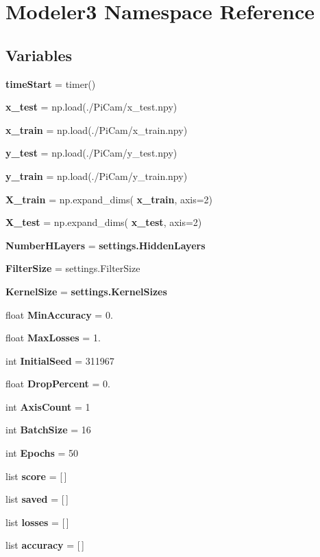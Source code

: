\section{Modeler3 Namespace Reference}
\label{namespace_modeler3}
\subsection*{Variables}
\begin{DoxyCompactItemize}
\item 
\textbf{ time\+Start} = timer()
\item 
\textbf{ x\+\_\+test} = np.\+load(\textquotesingle{}./Pi\+Cam/x\+\_\+test.\+npy\textquotesingle{})
\item 
\textbf{ x\+\_\+train} = np.\+load(\textquotesingle{}./Pi\+Cam/x\+\_\+train.\+npy\textquotesingle{})
\item 
\textbf{ y\+\_\+test} = np.\+load(\textquotesingle{}./Pi\+Cam/y\+\_\+test.\+npy\textquotesingle{})
\item 
\textbf{ y\+\_\+train} = np.\+load(\textquotesingle{}./Pi\+Cam/y\+\_\+train.\+npy\textquotesingle{})
\item 
\textbf{ X\+\_\+train} = np.\+expand\+\_\+dims(\textbf{ x\+\_\+train}, axis=2)
\item 
\textbf{ X\+\_\+test} = np.\+expand\+\_\+dims(\textbf{ x\+\_\+test}, axis=2)
\item 
\textbf{ Number\+H\+Layers} = \textbf{ settings.\+Hidden\+Layers}
\item 
\textbf{ Filter\+Size} = settings.\+Filter\+Size
\item 
\textbf{ Kernel\+Size} = \textbf{ settings.\+Kernel\+Sizes}
\item 
float \textbf{ Min\+Accuracy} = 0.
\item 
float \textbf{ Max\+Losses} = 1.
\item 
int \textbf{ Initial\+Seed} = 311967
\item 
float \textbf{ Drop\+Percent} = 0.
\item 
int \textbf{ Axis\+Count} = 1
\item 
int \textbf{ Batch\+Size} = 16
\item 
int \textbf{ Epochs} = 50
\item 
list \textbf{ score} = [$\,$]
\item 
list \textbf{ saved} = [$\,$]
\item 
list \textbf{ losses} = [$\,$]
\item 
list \textbf{ accuracy} = [$\,$]

\end{DoxyCompactItemize}
